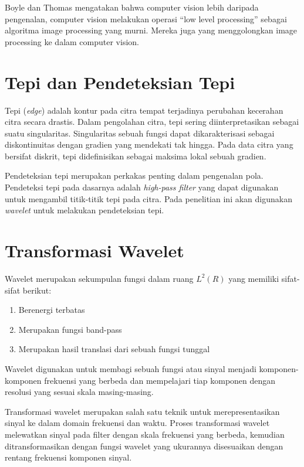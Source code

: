 \documentclass[laporan.tex]{subfiles}
\begin{document}
Boyle dan Thomas mengatakan bahwa computer vision lebih daripada pengenalan, computer vision melakukan operasi “low level processing” sebagai algoritma image processing yang murni. Mereka juga yang menggolongkan image processing ke dalam computer vision.

\section{Tepi dan Pendeteksian Tepi}

Tepi (\emph{edge}) adalah kontur pada citra tempat terjadinya perubahan kecerahan citra secara drastis. Dalam pengolahan citra, tepi sering diinterpretasikan sebagai suatu singularitas. Singularitas sebuah fungsi dapat dikarakterisasi sebagai diskontinuitas dengan gradien yang mendekati tak hingga. Pada data citra yang bersifat diskrit, tepi didefinisikan sebagai maksima lokal sebuah gradien.

Pendeteksian tepi merupakan perkakas penting dalam pengenalan pola. Pendeteksi tepi pada dasarnya adalah \emph{high-pass filter} yang dapat digunakan untuk mengambil titik-titik tepi pada citra. Pada penelitian ini akan digunakan \emph{wavelet} untuk melakukan pendeteksian tepi.

\section{Transformasi Wavelet}

Wavelet merupakan sekumpulan fungsi dalam ruang $L^2(R)$ yang memiliki sifat-sifat berikut:

\begin{enumerate}
\item Berenergi terbatas
\item Merupakan fungsi band-pass
\item Merupakan hasil translasi dari sebuah fungsi tunggal
\end{enumerate}

Wavelet digunakan untuk membagi sebuah fungsi atau sinyal menjadi komponen-komponen frekuensi yang berbeda dan mempelajari tiap komponen dengan resolusi yang sesuai skala masing-masing.

Transformasi wavelet merupakan salah satu teknik untuk merepresentasikan sinyal ke dalam domain frekuensi dan waktu. Proses transformasi wavelet melewatkan sinyal pada filter dengan skala frekuensi yang berbeda, kemudian ditransformasikan dengan fungsi wavelet yang ukurannya disesuaikan dengan rentang frekuensi komponen sinyal.
\end{document}
